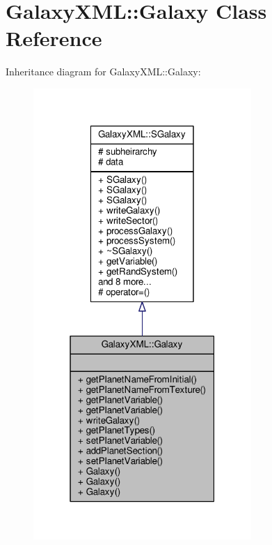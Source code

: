 \hypertarget{classGalaxyXML_1_1Galaxy}{}\section{Galaxy\+X\+ML\+:\+:Galaxy Class Reference}
\label{classGalaxyXML_1_1Galaxy}


Inheritance diagram for Galaxy\+X\+ML\+:\+:Galaxy\+:
\nopagebreak
\begin{figure}[H]
\begin{center}
\leavevmode
\includegraphics[width=235pt]{d3/d1f/classGalaxyXML_1_1Galaxy__inherit__graph}
\end{center}
\end{figure}


